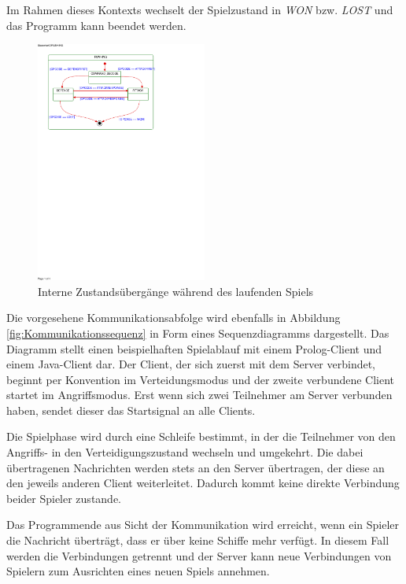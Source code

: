 Im Rahmen dieses Kontexts wechselt der Spielzustand in \emph{WON} bzw. \emph{LOST} und das Programm kann beendet werden.

\begin{figure}[H]
  \centering
  \includegraphics[trim=10mm 185mm 60mm 10mm,clip,width=0.5\textwidth]{images/SubSMRUNNING.pdf}
  \caption{Interne Zustandsübergänge während des laufenden Spiels}
  \label{fig:SubClientstates}
\end{figure}

Die vorgesehene Kommunikationsabfolge wird ebenfalls in Abbildung \ref{fig:Kommunikationssequenz} in Form eines Sequenzdiagramms dargestellt.
Das Diagramm stellt einen beispielhaften Spielablauf mit einem Prolog-Client und einem Java-Client dar. 
Der Client, der sich zuerst mit dem Server verbindet, beginnt per Konvention im Verteidungsmodus und der zweite verbundene Client startet im Angriffsmodus.
Erst wenn sich zwei Teilnehmer am Server verbunden haben, sendet dieser das Startsignal an alle Clients.

Die Spielphase wird durch eine Schleife bestimmt, in der die Teilnehmer von den Angriffs- in den Verteidigungszustand wechseln und umgekehrt.
Die dabei übertragenen Nachrichten werden stets an den Server übertragen, der diese an den jeweils anderen Client weiterleitet.
Dadurch kommt keine direkte Verbindung beider Spieler zustande.

Das Programmende aus Sicht der Kommunikation wird erreicht, wenn ein Spieler die Nachricht überträgt, dass er über keine Schiffe mehr verfügt.
In diesem Fall werden die Verbindungen getrennt und der Server kann neue Verbindungen von Spielern zum Ausrichten eines neuen Spiels annehmen.

